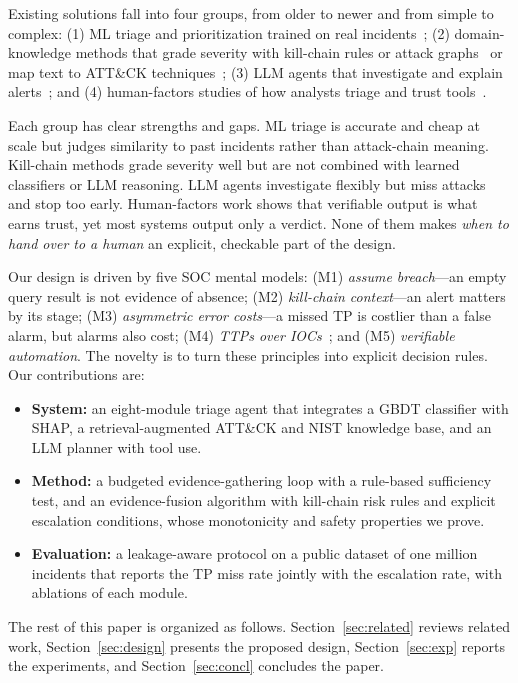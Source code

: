 \documentclass[conference]{IEEEtran}
\begin{document}
Existing solutions fall into four groups, from older to newer and from
simple to complex: (1) ML triage and prioritization trained on real
incidents~\cite{freitas2024cgr,freitas2026aip}; (2) domain-knowledge
methods that grade severity with kill-chain rules or attack
graphs~\cite{sadlek2025,garcia2025rosca} or map text to ATT\&CK
techniques~\cite{lekssays2025}; (3) LLM agents that investigate and
explain alerts~\cite{wei2025cortex,tsegai2026,wu2025excytin}; and
(4) human-factors studies of how analysts triage and trust
tools~\cite{tilbury2026,kersten2025,banstola2026}.

Each group has clear strengths and gaps. ML triage is accurate and
cheap at scale but judges similarity to past incidents rather than
attack-chain meaning. Kill-chain methods grade severity well but are
not combined with learned classifiers or LLM reasoning. LLM agents
investigate flexibly but miss attacks and stop too early. Human-factors
work shows that verifiable output is what earns trust, yet most systems
output only a verdict. None of them makes \emph{when to hand over to a
human} an explicit, checkable part of the design.

Our design is driven by five SOC mental models: (M1) \emph{assume
breach}---an empty query result is not evidence of absence;
(M2) \emph{kill-chain context}---an alert matters by its stage;
(M3) \emph{asymmetric error costs}---a missed TP is costlier than a
false alarm, but alarms also cost; (M4) \emph{TTPs over
IOCs}~\cite{bianco2013}; and (M5) \emph{verifiable automation}. The
novelty is to turn these principles into explicit decision rules. Our
contributions are:
\begin{itemize}
\item \textbf{System:} an eight-module triage agent that integrates a
GBDT classifier with SHAP, a retrieval-augmented ATT\&CK and NIST
knowledge base, and an LLM planner with tool use.
\item \textbf{Method:} a budgeted evidence-gathering loop with a
rule-based sufficiency test, and an evidence-fusion algorithm with
kill-chain risk rules and explicit escalation conditions, whose
monotonicity and safety properties we prove.
\item \textbf{Evaluation:} a leakage-aware protocol on a public
dataset of one million incidents that reports the TP miss rate jointly
with the escalation rate, with ablations of each module.
\end{itemize}

The rest of this paper is organized as follows.
Section~\ref{sec:related} reviews related work,
Section~\ref{sec:design} presents the proposed design,
Section~\ref{sec:exp} reports the experiments, and
Section~\ref{sec:concl} concludes the paper.
\end{document}
